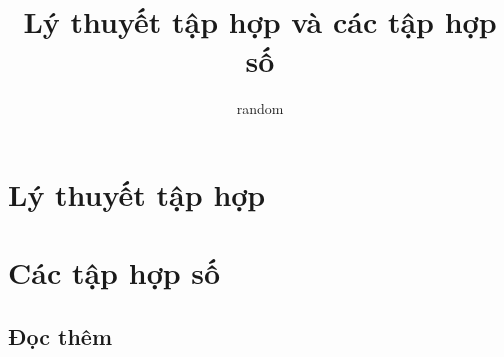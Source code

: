 \documentclass[oneside]{book}
\title{Lý thuyết tập hợp và các tập hợp số}
\author{random}
\date{\settheoryversion}
\theoremstyle{definition}
\begin{document}
\maketitle




\tableofcontents

\part{Lý thuyết tập hợp}\label{part1}





\part{Các tập hợp số}\label{part2}






\appendix

\chapter{Đọc thêm}

\printindex
\printbibliography[heading=bibintoc,title={Tài liệu tham khảo}]
\end{document}
